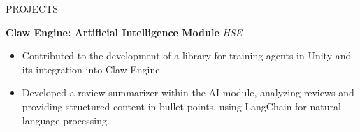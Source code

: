 \documentclass{resume}
\begin{document}

\begin{rSection}{PROJECTS}

\textbf{Claw Engine: Artificial Intelligence Module}  
\textit{HSE}  
\begin{itemize}
    \itemsep -3pt {} 
    \item Contributed to the development of a library for training agents in Unity and its integration into Claw Engine.
    \item Developed a review summarizer within the AI module, analyzing reviews and providing structured content in bullet points, using LangChain for natural language processing.
\end{itemize}

\end{rSection}
\end{document}
